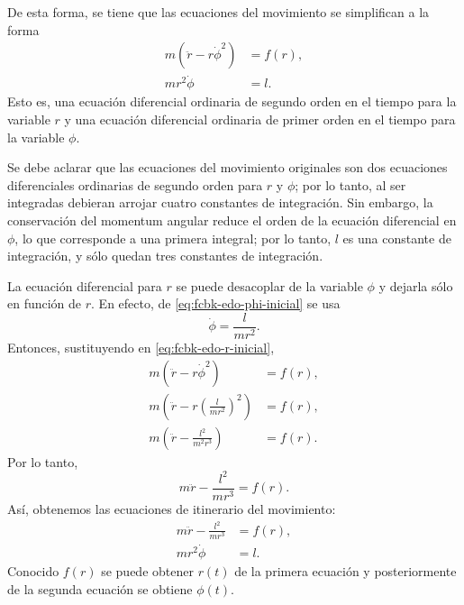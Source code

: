 \documentclass[../apunte_mecanica_clasica.tex]{subfiles}%
\begin{document}
De esta forma, se tiene que las ecuaciones del movimiento se simplifican a la forma
\begin{align}
    m(\ddot r-r\dot\phi^2)&=f(r),
    \label{eq:fcbk-edo-r-inicial}\\
    mr^2\dot\phi&=l.
    \label{eq:fcbk-edo-phi-inicial}
\end{align}
Esto es, una ecuación diferencial ordinaria de segundo orden en el tiempo para la variable $r$ y una ecuación diferencial ordinaria de primer orden en el tiempo para la variable $\phi$.

Se debe aclarar que las ecuaciones del movimiento originales son dos ecuaciones diferenciales ordinarias de segundo orden para $r$ y $\phi$; por lo tanto, al ser integradas debieran arrojar cuatro constantes de integración. Sin embargo, la conservación del momentum angular reduce el orden de la ecuación diferencial en $\phi$, lo que corresponde a una primera integral; por lo tanto, $l$ es una constante de integración, y sólo quedan tres constantes de integración.

La ecuación diferencial para $r$ se puede desacoplar de la variable $\phi$ y dejarla sólo en función de $r$. En efecto, de \eqref{eq:fcbk-edo-phi-inicial} se usa
\begin{equation}
    \dot\phi=\frac{l}{mr^2}.
    \label{eq:fcbk-phidot-l-mr2}
\end{equation}
Entonces, sustituyendo en \eqref{eq:fcbk-edo-r-inicial},
\begin{equation}
    \begin{aligned}
    m(\ddot r-r\dot\phi^2)&=f(r),\\
    m\left(\ddot r-r\left(\frac{l}{mr^2}\right)^2\right)&=f(r),\\
    m\left(\ddot r-\frac{l^2}{m^2r^3}\right)&=f(r).
    \end{aligned}
    \label{eq:fcbk-desacople-r}
\end{equation}
Por lo tanto,
\begin{equation}
    m\ddot r-\frac{l^2}{mr^3}=f(r).
    \label{eq:fcbk-ecuacion-r-desacoplada}
\end{equation}
Así, obtenemos las ecuaciones de itinerario del movimiento:
\begin{align}
    m\ddot r-\frac{l^2}{mr^3}&=f(r),
    \label{eq:fcbk-itinerario-r}\\
    mr^2\dot\phi&=l.
    \label{eq:fcbk-itinerario-phi}
\end{align}
Conocido $f(r)$ se puede obtener $r(t)$ de la primera ecuación y posteriormente de la segunda ecuación se obtiene $\phi(t)$.
\end{document}
